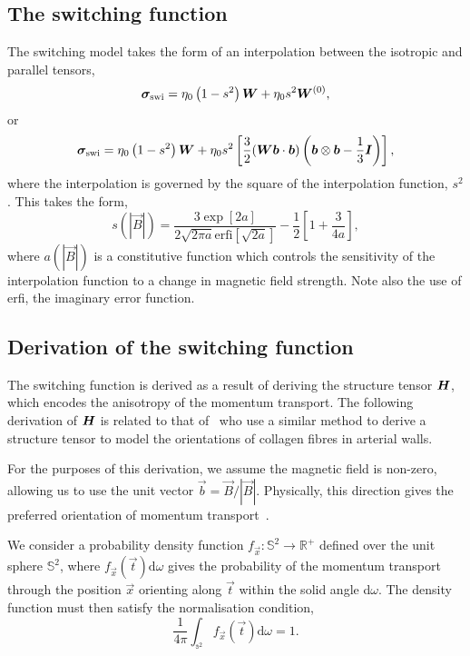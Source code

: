 \subsection{The switching function}

The switching model takes the form of an interpolation between the isotropic and parallel tensors,
\begin{equation}
  \label{eq:switching_model_simple}
{\bm \sigma}_{\text{swi}} = \eta_0 \left( 1 - s^2 \right) {\bm W} + \eta_0 s^2 {\bm W}^{(0)},
\end{equation}
or
\begin{equation}
  \label{eq:switching_model}
{\bm \sigma}_{\text{swi}} = \eta_0 \left( 1 - s^2 \right) {\bm W} + \eta_0 s^2 \left[\frac{3}{2}({\bm W}{\bm b}\cdot{\bm b}) \left( {\bm b} \otimes {\bm b} - \frac{1}{3}{\bm I} \right)\right],
\end{equation}
where the interpolation is governed by the square of the interpolation function, $s^2$. This takes the form,
\begin{equation}
  \label{eq:switching_function}
s(|\vec{B}|) = \frac{3 \exp[2a]}{2\sqrt{2\pi a} \text{erfi}[\sqrt{2a}]} - \frac{1}{2}\left[ 1 + \frac{3}{4a} \right],
\end{equation}
where $a(|\vec{B}|)$ is a constitutive function which controls the sensitivity of the interpolation function to a change in magnetic field strength. Note also the use of erfi, the imaginary error function.

\subsection{Derivation of the switching function}

The switching function is derived as a result of deriving the structure tensor ${\bm H}$, which encodes the anisotropy of the momentum transport. The following derivation of ${\bm H}$ is related to that of~\cite{gasserHyperelasticModellingArterial2006} who use a similar method to derive a structure tensor to model the orientations of collagen fibres in arterial walls. 

For the purposes of this derivation, we assume the magnetic field is non-zero, allowing us to use the unit vector $\vec{b} = \vec{B}/|\vec{B}|$. Physically, this direction gives the preferred orientation of momentum transport~\cite{braginskiiTransportProcessesPlasma1965}.

We consider a probability density function $f_{\vec{x}} : \mathbb{S}^2 \to \mathbb{R}^+$ defined over the unit sphere $\mathbb{S}^2$, where $f_\vec{x}(\vec{t}) \text{d}\omega$ gives the probability of the momentum transport through the position $\vec{x}$ orienting along $\vec{t}$ within the solid angle d$\omega$. The density function must then satisfy the normalisation condition,
\begin{equation}
  \label{eq:normalisation_condition}
  \frac{1}{4\pi} \int_{\mathbb{s}^2} f_\vec{x}(\vec{t}) \text{d}\omega = 1.
\end{equation}

